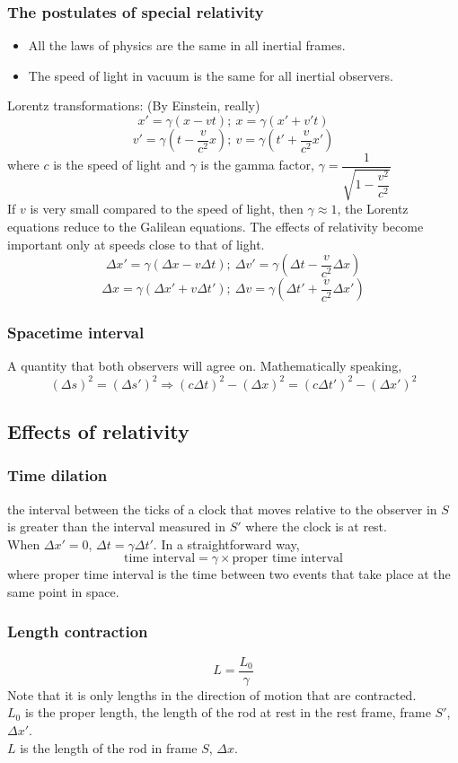 \documentclass[a4paper,12pt]{article}
\begin{document}
\subsubsection*{The postulates of special relativity}
\begin{itemize}
  \item All the laws of physics are the same in all inertial frames.
  \item The speed of light in vacuum is the same for all inertial observers.
\end{itemize}
Lorentz transformations: (By Einstein, really)
\[x'=\gamma (x-vt);\ x=\gamma(x'+v't)\]
\[v'=\gamma\left(t-\dfrac{v}{c^2}x\right);\ v=\gamma\left(t'+\dfrac{v}{c^2}x'\right)\]
where $c$ is the speed of light and $\gamma$ is the gamma factor, $\displaystyle \gamma=\dfrac{1}{\sqrt{1-\dfrac{v^2}{c^2}}}$
\\If $v$ is very small
compared to the speed of light, then $\gamma\approx1$, the Lorentz equations reduce to
the Galilean equations. The effects of relativity become important only at speeds close to that of light.
\[\Delta x'=\gamma(\Delta x-v\Delta t);\ \Delta v'=\gamma(\Delta t-\dfrac{v}{c^2}\Delta x)\]
\[\Delta x=\gamma(\Delta x'+v\Delta t');\ \Delta v=\gamma(\Delta t'+\dfrac{v}{c^2}\Delta x')\]
\subsubsection*{Spacetime interval}
A quantity that both observers will agree on. Mathematically speaking,
\[(\Delta s)^2=(\Delta s')^2 \Rightarrow (c\Delta t)^2-(\Delta x)^2=(c\Delta t')^2-(\Delta x')^2\]
\subsection{Effects of relativity}
\subsubsection*{Time dilation} the interval between the ticks of a clock that moves relative to the observer in $S$ is greater than the interval measured in $S'$ where the clock is at rest.\\
When $\Delta x'=0$, $\Delta t=\gamma \Delta t'$. In a straightforward way,
\[\text{time interval}=\gamma\times \text{proper time interval}\]
where proper time interval is the time between two events that take place at the same point in space.
\subsubsection*{Length contraction}
\[L=\dfrac{L_0}{\gamma}\]
Note that it is only lengths in the direction of motion that are contracted.\\
$L_0$ is the proper length, the length of the rod at rest in the rest frame, frame $S'$, $\Delta x'$.\\
$L$ is the length of the rod in frame $S$, $\Delta x$.
\end{document}
